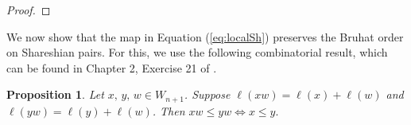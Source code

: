 \documentclass[12pt]{amsart}
\numberwithin{equation}{section}
\newtheorem{prop}[thm]{Proposition}
\newcommand{\cW}{{ W}}
\begin{document}
\begin{proof}




\end{proof}

We now show that the map in Equation (\ref{eq:localSh}) preserves the Bruhat order on Shareshian pairs.   For this, we use the following combinatorial result, which can be found in Chapter 2, Exercise 21 of \cite{BB}.
 \begin{prop}\label{p:BBresult}
 Let $x,\, y, \, w\in{\cW}_{n+1}$.  Suppose $\ell(xw)=\ell(x)+\ell(w)$ and $\ell(yw)=\ell(y)+\ell(w)$.  Then $xw\leq yw\Leftrightarrow x\leq y.$
\end{prop}
\end{document}
